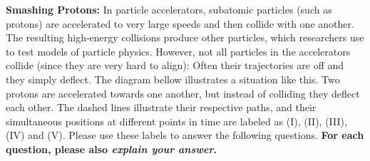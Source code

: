 \documentclass[addpoints,12pt]{exam}
\begin{document}
\begin{questions}
\begin{minipage}{\linewidth}
\end{minipage}

\clearpage

\question \textbf{Smashing Protons:} In particle accelerators, subatomic particles (such as protons) are accelerated to very large speeds and then collide with one another. The resulting high-energy collisions produce other particles, which researchers use to test models of particle physics. However, not all particles in the accelerators collide (since they are very hard to align): Often their trajectories are off and they simply deflect. The diagram bellow illustrates a situation like this. Two protons are accelerated towards one another, but instead of colliding they deflect each other. The dashed lines illustrate their respective paths, and their simultaneous positions at different points in time are labeled as (I), (II), (III), (IV) and (V). Please use these labels to answer the following questions. \textbf{For each question, please also \textit{explain your answer}.}
	
	\noindent\begin{center}\end{center}
	
\end{questions}
\end{document}
